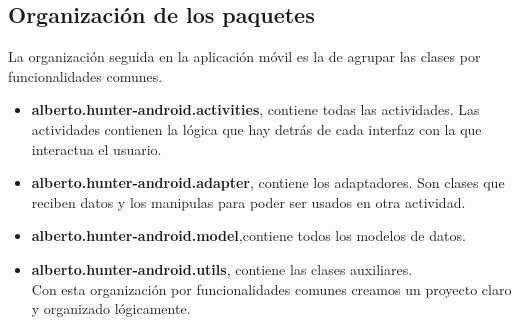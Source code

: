 \subsection{Organización de los paquetes}
La organización seguida en la aplicación móvil es la de agrupar las clases por funcionalidades comunes.
\begin{itemize}
\item  \textbf{alberto.hunter-android.activities}, contiene todas las actividades. Las actividades contienen la lógica que hay detrás de cada interfaz con la que interactua el usuario.
\item \textbf{alberto.hunter-android.adapter}, contiene los adaptadores. Son clases que reciben datos y los manipulas para poder ser usados en otra actividad.
\item \textbf{alberto.hunter-android.model},contiene todos los modelos de datos.
\item \textbf{alberto.hunter-android.utils}, contiene las clases auxiliares.\\ 

Con esta organización por funcionalidades comunes creamos un proyecto claro y  organizado lógicamente.

\end{itemize}


